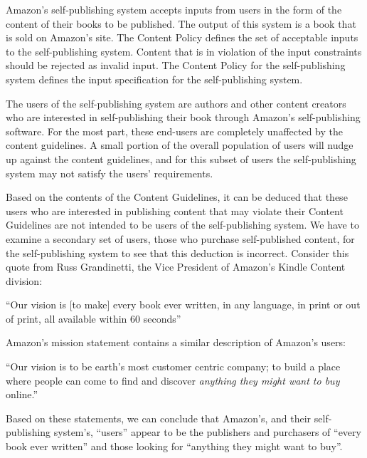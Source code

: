 \documentclass[11pt]{article}
\begin{document}
\begin{multicols}{2}
Amazon's self-publishing system accepts inputs from users in the form of the content of their books to be published.  The output of this system is a book that is sold on Amazon's site.  The Content Policy defines the set of acceptable inputs to the self-publishing system.  Content that is in violation of the input constraints should be rejected as invalid input.  The Content Policy for the self-publishing system defines the input specification for the self-publishing system. 

The users of the self-publishing system are authors and other content creators who are interested in self-publishing their book through Amazon's self-publishing software.  For the most part, these end-users are completely unaffected by the content guidelines.  A small portion of the overall population of users will nudge up against the content guidelines, and for this subset of users the self-publishing system may not satisfy the users' requirements.

Based on the contents of the Content Guidelines, it can be deduced that these users who are interested in publishing content that may violate their Content Guidelines are not intended to be users of the self-publishing system.  We have to examine a secondary set of users, those who purchase self-published content, for the self-publishing system to see that this deduction is incorrect.  Consider this quote from Russ Grandinetti, the Vice President of Amazon's Kindle Content division:

{\addtolength{\leftskip}{6mm}

``Our vision is [to make] every book ever written, in any language, in print or out of print, all available within 60 seconds'' \cite{LATimesRussQuote}

}

Amazon's mission statement contains a similar description of Amazon's users:

{\addtolength{\leftskip}{6mm}

``Our vision is to be earth's most customer centric company; to build a place where people can come to find and discover \emph{anything they might want to buy} online.'' \cite[Emphasis Mine]{AmazonIRFAQ}

}

Based on these statements, we can conclude that Amazon's, and their self-publishing system's, ``users'' appear to be the publishers and purchasers of ``every book ever written'' and those looking for ``anything they might want to buy''.


\end{multicols}
\end{document}
